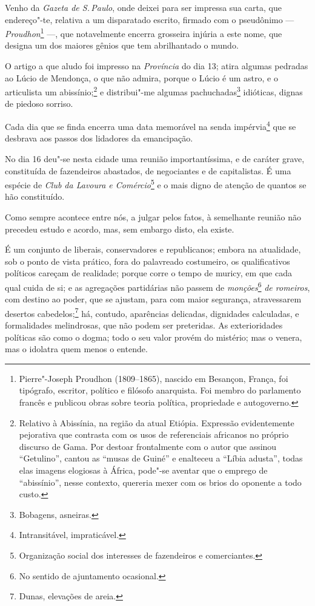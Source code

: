 Venho da \emph{Gazeta de S.\,Paulo}, onde deixei para ser impressa sua
carta, que endereço"-te, relativa a um disparatado escrito, firmado com o
pseudônimo --- \emph{Proudhon}\footnote{Pierre"-Joseph Proudhon
  (1809--1865), nascido em Besançon, França, foi tipógrafo, escritor,
  político e filósofo anarquista. Foi membro do parlamento francês e
  publicou obras sobre teoria política, propriedade e autogoverno.}
---, que notavelmente encerra grosseira injúria a este nome, que
designa um dos maiores gênios que tem abrilhantado o mundo.

O artigo a que aludo foi impresso na \emph{Província} do dia 13; atira
algumas pedradas ao Lúcio de Mendonça, o que não admira, porque o Lúcio
é um astro, e o articulista um abissínio;\footnote{Relativo à
  Abissínia, na região da atual Etiópia. Expressão evidentemente
  pejorativa que contrasta com os usos de referenciais africanos no
  próprio discurso de Gama. Por destoar frontalmente com o autor que
  assinou ``Getulino'', cantou as ``musas de Guiné'' e enalteceu a ``Líbia
  adusta'', todas elas imagens elogiosas à África, pode"-se aventar que o
  emprego de ``abissínio'', nesse contexto, quereria mexer com os brios do
  oponente a todo custo.} e distribui"-me algumas pachuchadas\footnote{
  Bobagens, asneiras.} idióticas, dignas de piedoso sorriso.

Cada dia que se finda encerra uma data memorável na senda
impérvia\footnote{Intransitável, impraticável.} que se desbrava aos
passos dos lidadores da emancipação.

No dia 16 deu"-se nesta cidade uma reunião importantíssima, e de caráter
grave, constituída de fazendeiros abastados, de negociantes e de
capitalistas. É uma espécie de \emph{Club da Lavoura e
Comércio}\footnote{Organização social dos interesses de fazendeiros e
  comerciantes.} e o mais digno de atenção de quantos se hão
constituído.

Como sempre acontece entre nós, a julgar pelos fatos, à semelhante
reunião não precedeu estudo e acordo, mas, sem embargo disto, ela
existe.

É um conjunto de liberais, conservadores e republicanos; embora na
atualidade, sob o ponto de vista prático, fora do palavreado costumeiro,
os qualificativos políticos careçam de realidade; porque corre o tempo
de muricy, em que cada qual cuida de si; e as agregações partidárias não
passem de \emph{monções}\footnote{No sentido de ajuntamento ocasional.}
\emph{de romeiros}, com destino ao poder, que se ajustam, para com maior
segurança, atravessarem desertos cabedelos;\footnote{Dunas, elevações
  de areia.} há, contudo, aparências delicadas, dignidades calculadas,
e formalidades melindrosas, que não podem ser preteridas. As
exterioridades políticas são como o dogma; todo o seu valor provém do
mistério; mas o venera, mas o idolatra quem menos o entende.

